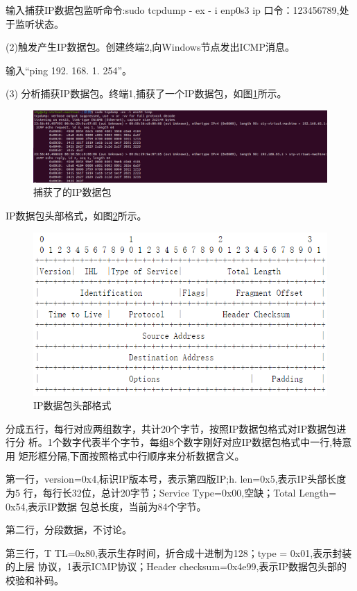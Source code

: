 \documentclass[lang=cn,11pt,a4paper,cite=authoryear]{elegantpaper}
\begin{document}
输入捕获IP数据包监听命令:sudo tcpdump - ex - i enp0s3 ip 口令：123456789,处于监听状态。

(2)触发产生IP数据包。创建终端2,向Windows节点发出ICMP消息。

输入“ping 192. 168. 1. 254”。

(3)	分析捕获IP数据包。终端1,捕获了一个IP数据包，如图\ref{fig:ip}所示。

\begin{figure}[htbp]
	\centering
	\includegraphics[width=\linewidth]{image/ip}
	\caption{捕获了的IP数据包}
	\label{fig:ip}
\end{figure}


IP数据包头部格式，如图\ref{fig:screenshot049}所示。

\begin{figure}[htbp]
	\centering
	\includegraphics[width=0.8\linewidth]{image/screenshot049}
	\caption{IP数据包头部格式}
	\label{fig:screenshot049}
\end{figure}

分成五行，每行对应两组数字，共计20个字节，按照IP数据包格式对IP数据包进行分 析。1个数字代表半个字节，每组8个数字刚好对应IP数据包格式中一行,特意用 矩形框分隔,下面按照格式中行顺序来分析数据含义。

第一行，version=0x4,标识IP版本号，表示第四版IP;h. len=0x5,表示IP头部长度为5 行，每行长32位，总计20字节；Service Type=0x00,空缺；Total Length= 0x54,表示IP数据 包总长度，当前为84个字节。

第二行，分段数据，不讨论。

第三行，T TL=0x80,表示生存时间，折合成十进制为128；type = 0x01,表示封装的上层 协议，1表示ICMP协议；Header checksum=0x4e99,表示IP数据包头部的校验和补码。 
\end{document}
